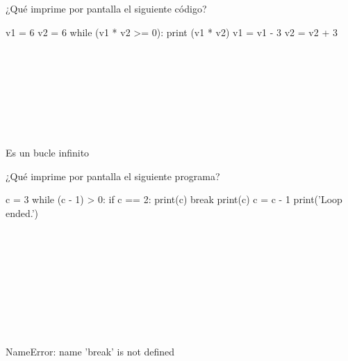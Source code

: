 \begin{ejercicio} ¿Qué imprime por pantalla el siguiente código?

\begin{python}
v1 = 6
v2 = 6
while (v1 * v2 >= 0):
    print (v1 * v2)
    v1 = v1 - 3
    v2 = v2 + 3
 \end{python}

\begin{choices}
    \choice 
{}\\
\\

\choice 
{}\\

\choice     %
\\
\\

\choice Es un bucle infinito

\end{choices}

\end{ejercicio}

\begin{ejercicio} 
¿Qué imprime por pantalla el siguiente programa?

\begin{python}
c = 3
while (c - 1) > 0:
    if c == 2:
       print(c)
       break
    print(c)
    c = c - 1
print('Loop ended.')
\end{python}

\begin{choices}
    \choice    %
\\
\\
    \choice 
{}\\
\\

    
    \choice 
    \\
\\
\\
     
    \choice NameError: name 'break'  is not defined
\end{choices}
\end{ejercicio}

\newpage


